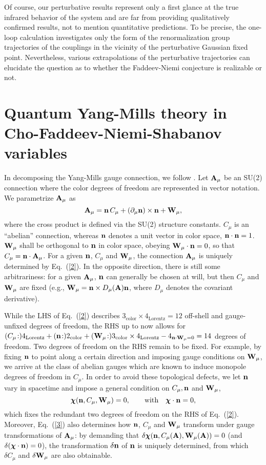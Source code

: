 \documentclass[a4paper,12pt]{article}
\newcommand{\re}[1]{~(\ref{#1})}
\begin{document}
Of course, our perturbative results represent only a first glance at
the true infrared behavior of the system and are far from providing
qualitatively confirmed results, not to mention quantitative
predictions. To be precise, the one-loop calculation investigates only
the form of the renormalization group trajectories of the couplings in
the vicinity of the perturbative Gaussian fixed point. Nevertheless,
various extrapolations of the perturbative trajectories can elucidate
the question as to whether the Faddeev-Niemi conjecture is realizable
or not.

\section{Quantum Yang-Mills theory in Cho-Faddeev-Niemi-Shabanov
  variables} 

In decomposing the Yang-Mills gauge connection, we follow
\cite{Cho:1980nv,Shabanov:1999xy,Shabanov:1999uv}. Let $\mathbf{A}_\mu$ be an
SU(2) connection where the color degrees of freedom are represented in
vector notation. We parametrize $\mathbf{A}_\mu$ as
\begin{equation}
\mathbf{A}_\mu=\mathbf{n}\, C_\mu +(\partial_\mu\mathbf{n})\times\mathbf{n} +\mathbf{W}_\mu,\label{2}
\end{equation}
where the cross product is defined via the SU(2) structure constants.
$C_\mu$ is an ``abelian'' connection, whereas $\mathbf{n}$ denotes a unit
vector in color space, $\mathbf{n}\cdot\mathbf{n}=1$. $\mathbf{W}_\mu$ shall be orthogonal
to $\mathbf{n}$ in color space, obeying $\mathbf{W}_\mu\cdot\mathbf{n}=0$, so that
$C_\mu=\mathbf{n}\cdot\mathbf{A}_\mu$. For a given $\mathbf{n}$, $C_\mu$ and $\mathbf{W}_\mu$, the
connection $\mathbf{A}_\mu$ is uniquely determined by Eq.\re{2}. In the
opposite direction, there is still some arbitrariness: for a given
$\mathbf{A}_\mu$, $\mathbf{n}$ can generally be chosen at will, but then $C_\mu$ and
$\mathbf{W}_\mu$ are fixed (e.g., $\mathbf{W}_\mu=\mathbf{n}\times D_\mu(\mathbf{A})\mathbf{n}$, where
$D_\mu$ denotes the covariant derivative).

While the LHS of Eq.\re{2} describes $3_{\text{color}}\times
4_{\text{Lorentz}}=12$ off-shell and gauge-unfixed degrees of freedom,
the RHS up to now allows for $(C_\mu\!:)4_{\text{Lorentz}}
+(\mathbf{n}\!:)2_{\text{color}} +(\mathbf{W}_\mu\!:) 3_{\text{color}}\times
4_{\text{Lorentz}}-4_{\mathbf{n}\cdot\mathbf{W}_\mu=0} =14$ degrees of freedom. Two
degrees of freedom on the RHS remain to be fixed. For example, by
fixing $\mathbf{n}$ to point along a certain direction and imposing gauge
conditions on $\mathbf{W}_\mu$, we arrive at the class of abelian gauges
which are known to induce monopole degrees of freedom in $C_\mu$. In
order to avoid these topological defects, we let $\mathbf{n}$ vary in
spacetime and impose a general condition on $C_\mu,\mathbf{n}$ and $\mathbf{W}_\mu$,
\begin{equation}
\boldsymbol{\chi}(\mathbf{n},C_\mu,\mathbf{W}_\mu)=0, \qquad\text{with}\quad
\boldsymbol{\chi}\cdot\mathbf{n}=0, \label{3}
\end{equation}
which fixes the redundant two degrees of freedom on the RHS of
Eq.\re{2}. Moreover, Eq.\re{3} also determines how $\mathbf{n}$, $C_\mu$ and
$\mathbf{W}_\mu$ transform under gauge transformations of $\mathbf{A}_\mu$: by 
demanding that $\delta\boldsymbol{\chi}(\mathbf{n},C_\mu(\mathbf{A}),\mathbf{W}_\mu(\mathbf{A}))=0$ (and
$\delta(\boldsymbol{\chi}\cdot\mathbf{n})=0$), the transformation $\delta \mathbf{n}$ of $\mathbf{n}$ is
uniquely determined, from which $\delta C_\mu$ and $\delta\mathbf{W}_\mu$ are
also obtainable.
\end{document}
